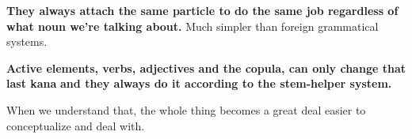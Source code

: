 {\bf They always attach the same particle to do the same job regardless of what noun we're talking about.} Much simpler than foreign grammatical systems.

{\bf Active elements, verbs, adjectives and the copula, can only change that last kana} {\bf and they always do it according to the stem-helper system.}

When we understand that, the whole thing becomes a great deal easier to conceptualize and deal with.

{}

\stopsectionlevel

\stopsectionlevel
